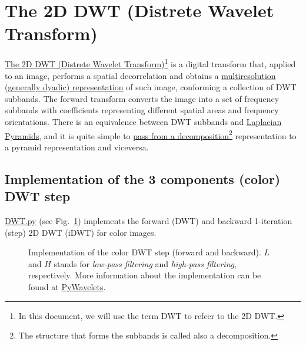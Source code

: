 \section{The 2D DWT (Distrete Wavelet Transform)}
\href{https://vicente-gonzalez-ruiz.github.io/image_transformations_for_coding/#x1-3100020}{The
  2D DWT (Distrete Wavelet Transform)\footnote{In this document, we will use the term DWT to refeer to
    the 2D DWT.}} is a digital
transform that, applied to an image, performs a spatial decorrelation
and obtains a
\href{https://vicente-gonzalez-ruiz.github.io/image_transformations_for_coding/index.html#x1-3500024}{multiresolution
  (generally dyadic) representation} of such image, conforming a
collection of DWT subbands. The forward transform converts the image
into a set of frequency subbands with coefficients representing
different spatial areas and frequency orientations. There is an
equivalence between DWT subbands and
\href{http://fourier.eng.hmc.edu/e161/lectures/canny/node3.html}{Laplacian
  Pyramids}, and it is quite simple to
\href{https://vicente-gonzalez-ruiz.github.io/pyramids-and-wavelets/}{pass
  from a decomposition\footnote{The structure that forms the subbands
    is called also a decomposition.} representation to a pyramid
  representation and viceversa}.

\subsection{Implementation of the 3 components (color) DWT step}
\href{https://github.com/Sistemas-Multimedia/MCDWT/blob/master/src/DWT.py}{DWT.py}
(see Fig.~\ref{fig:DWT}) implements the forward (DWT) and backward
1-iteration (step) 2D DWT (iDWT) for color images.

\begin{figure}
  
  
  \caption{Implementation of the color DWT step (forward and
    backward). $L$ and $H$ stands for \emph{low-pass filtering} and
    \emph{high-pass filtering}, respectively.  More information about the
    implementation can be found at
    \href{https://pywavelets.readthedocs.io/en/latest/index.html}{PyWavelets}.}
  \label{fig:DWT}
\end{figure}

